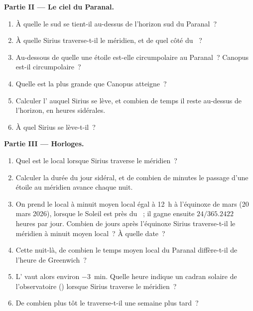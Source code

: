 \begin{problem}
\medskip
\noindent\textbf{Partie II --- Le ciel du Paranal.}
\begin{enumerate}[resume]
  \item À quelle  le  sud se tient-il au-dessus de
        l'horizon sud du Paranal~?
  \item À quelle  Sirius traverse-t-il le méridien, et de quel côté du
        ~?
  \item Au-dessous de quelle  une étoile est-elle circumpolaire au
        Paranal~? Canopus est-il circumpolaire~?
  \item Quelle est la plus grande  que Canopus atteigne~?
  \item Calculer l' auquel Sirius se lève, et combien de temps il
        reste au-dessus de l'horizon, en heures sidérales.
  \item À quel  Sirius se lève-t-il~?
\end{enumerate}

\medskip
\noindent\textbf{Partie III --- Horloges.}
\begin{enumerate}[resume]
  \item Quel est le  local lorsque Sirius traverse le méridien~?
  \item Calculer la durée du jour sidéral, et de combien de minutes le passage
        d'une étoile au méridien avance chaque nuit.
  \item On prend le  local à minuit moyen local égal à
        \qty{12}{h} à l'équinoxe de mars (20 mars 2026), lorsque le Soleil est
        près du ~; il gagne ensuite $24/365.2422$ heures par jour.
        Combien de jours après l'équinoxe Sirius traverse-t-il le méridien à
        minuit moyen local~? À quelle date~?
  \item Cette nuit-là, de combien le temps moyen local du Paranal diffère-t-il
        de l'heure de Greenwich~?
  \item L' vaut alors environ \qty{-3}{min}. Quelle heure
        indique un cadran solaire de l'observatoire ()
        lorsque Sirius traverse le méridien~?
  \item De combien plus tôt le traverse-t-il une semaine plus tard~?
\end{enumerate}


\end{problem}
